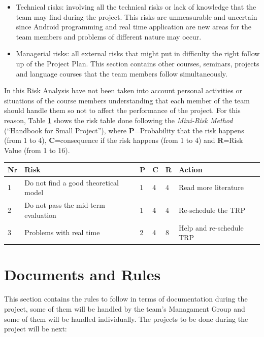 \documentclass[11pt]{article}
\begin{document}
\begin{itemize}
\item Technical risks: involving all the technical risks or lack of knowledge that the team may find during the project. This risks are unmeasurable and uncertain since Android programming and real time application are new areas for the team members and problems of different nature may occur.

\item Managerial risks: all external risks that might put in difficulty the right follow up of the Project Plan. This section contains other courses, seminars, projects and language courses that the team members follow simultaneously.

\end{itemize}

In this Risk Analysis have not been taken into account personal activities or situations of the course members understanding that each member of the team should handle them so not to affect the performance of the project. For this reason, Table \ref{tablerisk} shows the risk table done following the \textit{Mini-Risk Method} (``Handbook for Small Project''), where \textbf{P}=Probability that the risk happens (from 1 to 4), \textbf{C}=consequence if the risk happens (from 1 to 4) and \textbf{R}=Risk Value (from 1 to 16).


\begin{table}[h]
\label{tablerisk}
\centering
\begin{tabular}{l| l| l| l| l| l}
 Nr &Risk  &P  &C  &R &Action  \\
 \hline
 1 & Do not find a good theoretical model & 1 & 4 & 4 & Read more literature\\
 2 & Do not pass the mid-term evaluation & 1 & 4 & 4 & Re-schedule the TRP\\
 3 & Problems with real time & 2 & 4 & 8 & Help and re-schedule TRP \\
\end{tabular}
\end{table}



\section{Documents and Rules}
This section contains the rules to follow in terms of documentation during the project, some of them will be handled by the team's Managament Group and some of them will be handled individually. The projects to be done during the project will be next:
\end{document}

